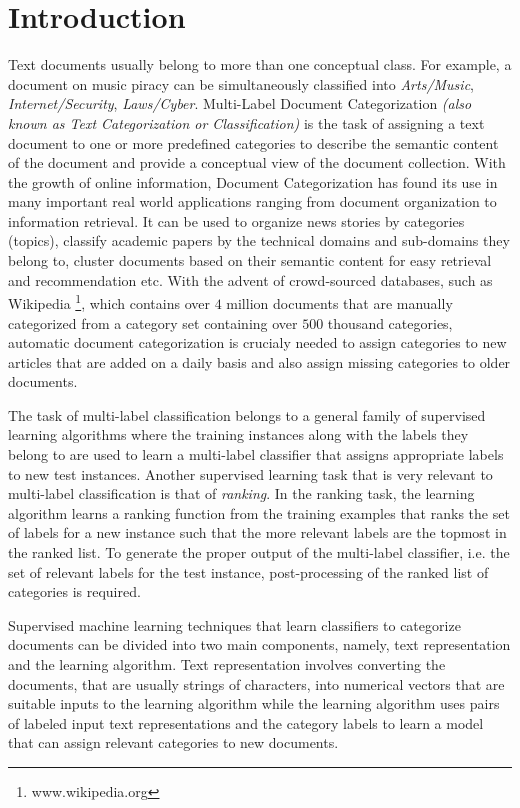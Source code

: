 \chapter{Introduction}
\label{chapter:introduction}

Text documents usually belong to more than one conceptual class. For example, a document on music piracy can be simultaneously classified into \emph{Arts/Music}, \emph{Internet/Security}, \emph{Laws/Cyber}. Multi-Label Document Categorization \emph{(also known as Text Categorization or Classification)} is the task of assigning a text document to one or more predefined categories to describe the semantic content of the document and provide a conceptual view of the document collection.
With the growth of online information, Document Categorization has found its use in many important real world applications ranging from document organization to information retrieval. It can be used to organize news stories by categories (topics), classify academic papers by the technical domains and sub-domains they belong to, cluster documents based on their semantic content for easy retrieval and recommendation etc.
With the advent of crowd-sourced databases, such as Wikipedia
\footnote{www.wikipedia.org}, which contains over $4$ million 
documents that are manually categorized from a category set containing 
over $500$ thousand categories, automatic document categorization is 
crucialy needed to assign categories to new articles that are added on 
a daily basis and also assign missing categories to older documents.

The task of multi-label classification belongs to a general family of 
supervised learning algorithms where the training instances along with 
the labels they belong to are used to learn a multi-label classifier that assigns appropriate labels to new test instances. 
Another supervised learning task that is very relevant to multi-label 
classification is that of \emph{ranking}. In the ranking task, the 
learning algorithm learns a ranking function from the training 
examples that ranks the set of labels for a new instance such that the 
more relevant labels are the topmost in the ranked list. 
To generate the proper output of the multi-label classifier, i.e. the 
set of relevant labels for the test instance, post-processing of the 
ranked list of categories is required.

Supervised machine learning techniques that learn classifiers to 
categorize documents  can be divided into two main components,
namely, text representation and the learning algorithm. 
Text representation involves converting the documents, that are 
usually strings of characters, into numerical vectors that are 
suitable inputs to the learning algorithm while the learning algorithm 
uses pairs of labeled input text representations and the category labels to learn a model that can assign relevant categories to new documents. 

